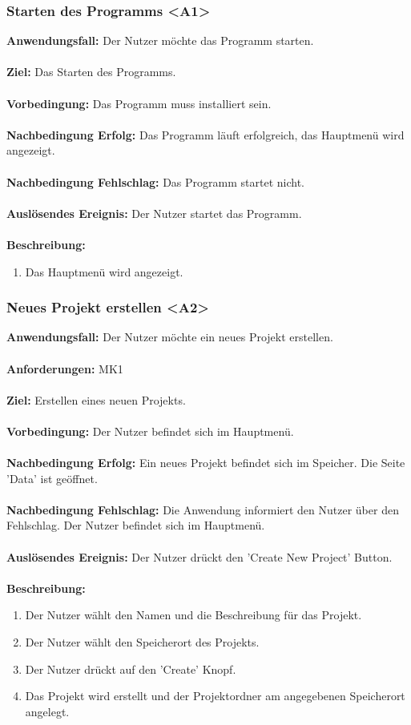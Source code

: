 \documentclass[parskip=full]{scrartcl} %
\begin{document}
\subsubsection*{Starten des Programms <A1>}
\textbf{Anwendungsfall:}  Der Nutzer möchte das Programm starten.\\\\
\textbf{Ziel:} Das Starten des Programms. \\\\
\textbf{Vorbedingung:} Das Programm muss installiert sein.  \\\\
\textbf{Nachbedingung Erfolg:} Das Programm läuft erfolgreich, das Hauptmenü wird angezeigt.\\\\
\textbf{Nachbedingung Fehlschlag:} Das Programm startet nicht. \\\\
\textbf{Auslösendes Ereignis:} Der Nutzer startet das Programm. \\\\
\textbf{Beschreibung:}
\begin{enumerate}
    \item Das Hauptmenü wird angezeigt.
\end{enumerate}
\newpage


\subsubsection*{Neues Projekt erstellen <A2>}
\textbf{Anwendungsfall:} Der Nutzer möchte ein neues Projekt erstellen.\\\\
\textbf{Anforderungen:} MK1\\\\
\textbf{Ziel:} Erstellen eines neuen Projekts. \\\\
\textbf{Vorbedingung:} Der Nutzer befindet sich im Hauptmenü. \\\\
\textbf{Nachbedingung Erfolg:} Ein neues Projekt befindet sich im Speicher. Die Seite 'Data' ist geöffnet.  \\\\
\textbf{Nachbedingung Fehlschlag:} Die Anwendung informiert den Nutzer über den Fehlschlag. Der Nutzer befindet sich im Hauptmenü. \\\\
\textbf{Auslösendes Ereignis:} Der Nutzer drückt den 'Create New Project' Button. \\\\
\textbf{Beschreibung:}
\begin{enumerate}
    \item Der Nutzer wählt den Namen und die Beschreibung für das Projekt.
    \item Der Nutzer wählt den Speicherort des Projekts.
    \item Der Nutzer drückt auf den 'Create' Knopf.
    \item Das Projekt wird erstellt und der Projektordner am angegebenen Speicherort angelegt.
\end{enumerate}
\newpage
\end{document}
